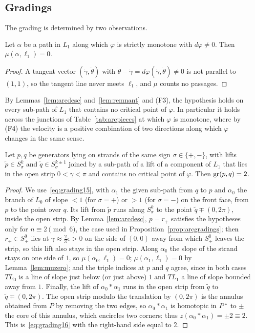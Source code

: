 \subsection{Gradings}\label{ss:gradings}
The grading is determined by two observations.

\begin{lemma}\label{lem:muzero}
Let $\alpha$ be a path in $L_1$ along which $\varphi$ is strictly monotone with $d\varphi\neq0$. Then
$\mu(\alpha,\ell_1)=0$.
\end{lemma}

\begin{proof}
A tangent vector $(\dot\gamma,\dot\theta)$ with $\dot\theta-\dot\gamma=d\varphi(\dot\gamma,\dot\theta)\neq0$ is not parallel to $(1,1)$, so the
tangent line never meets $\ell_1$, and $\mu$ counts no passages.
\end{proof}

By Lemmas~\ref{lem:arcdesc} and~\ref{lem:remnant} and (F3), the hypothesis holds on every sub-path of $L_1$
that contains no critical point of $\varphi$. In particular it holds across the junctions of
Table~\ref{tab:arcpieces} at which $\varphi$ is monotone, where by (F4) the velocity is a positive combination of
two directions along which $\varphi$ changes in the same sense.

\begin{lemma}\label{lem:zstep}
Let $p,q$ be generators lying on strands of the same sign $\sigma\in\{+,-\}$, with lifts $\tilde p\in S^k_\sigma$ and
$\tilde q\in S^{k\pm1}_\sigma$ joined by a sub-path of a lift of a component of $L_1$ that lies in the open strip
$0<\gamma<\pi$ and contains no critical point of $\varphi$. Then $\operatorname{gr}(p,q)=2$.
\end{lemma}

\begin{proof}
We use~\eqref{eq:grading15}, with $\alpha_1$ the given sub-path from $q$ to $p$ and $\alpha_0$ the branch of $L_0$ of slope
$<1$ (for $\sigma=+$) or $>1$ (for $\sigma=-$) on the front face, from $p$ to the point over $q$. Its lift from $\tilde p$ runs
along $S^k_\sigma$ to the point $\tilde q\mp(0,2\pi)$, inside the open strip. By Lemma~\ref{lem:arcdesc}, $p=r_+$ satisfies the
hypotheses only for $n\equiv2\pmod6$, the case used in Proposition~\ref{prop:arcgradings}; then $r_+\in S^0_+$ lies at
$\gamma\approx\frac23\epsilon>0$ on the side of $(0,0)$ away from which $S^0_+$ leaves the strip, so this lift also stays in
the open strip. Along $\alpha_0$ the slope of the
strand stays on one side of $1$, so $\mu(\alpha_0,\ell_1)=0$; $\mu(\alpha_1,\ell_1)=0$ by Lemma~\ref{lem:muzero}; and the
triple indices at $p$ and $q$ agree, since in both cases $T L_0$ is a line of slope just below (or just above) $1$
and $T L_1$ a line of slope bounded away from $1$. Finally, the lift of $\alpha_0*\alpha_1$ runs in the open strip from
$\tilde q$ to $\tilde q\mp(0,2\pi)$. The open strip modulo the translation by $(0,2\pi)$ is the annulus obtained from $P$ by
removing the two edges, so $\alpha_0*\alpha_1$ is homotopic in $P^{*}$ to $\pm$ the core of this annulus, which encircles
two corners; thus $z(\alpha_0*\alpha_1)=\pm2\equiv2$. This is~\eqref{eq:grading16} with the right-hand side equal to $2$.
\end{proof}

